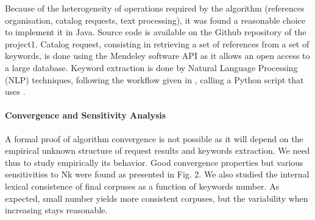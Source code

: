 Because of the heterogeneity of operations required by the algorithm (references organisation, catalog requests, text processing), it was found a reasonable choice to implement it in Java. Source code is available on the Github repository of the project1. Catalog request, consisting in retrieving a set of references from a set of keywords, is done using the Mendeley software API \cite{mendeley} as it allows an open access to a large database. Keyword extraction is done by Natural Language Processing (NLP) techniques, following the workflow given in \cite{chavalarias2013phylomemetic}, calling a Python script that uses \cite{bird2006nltk}.


\paragraph{Convergence and Sensitivity Analysis}

A formal proof of algorithm convergence is not possible as it will depend on the empirical unknown structure of request results and keywords extraction. We need thus to study empirically its behavior. Good convergence properties but various sensitivities to Nk were found as presented in Fig. 2. We also studied the internal lexical consistence of final corpuses as a function of keywords number. As expected, small number yields more consistent corpuses, but the variability when increasing stays reasonable.


